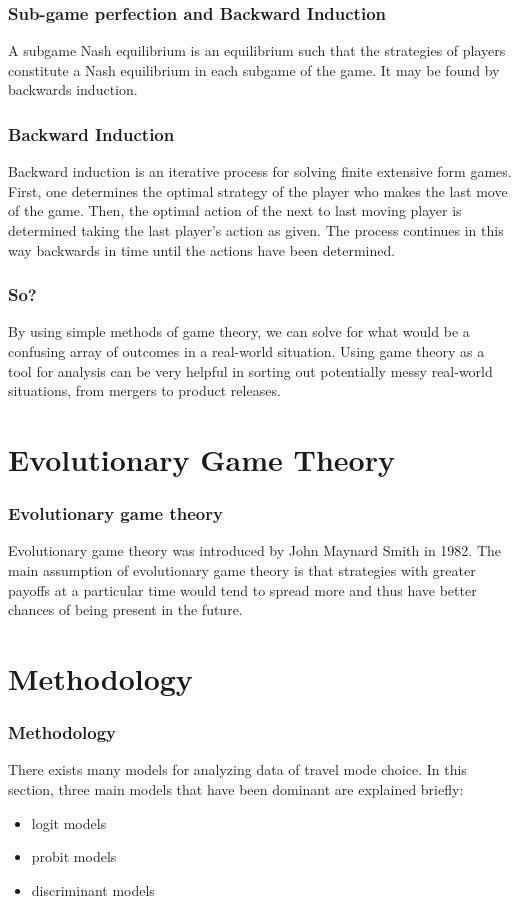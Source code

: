 \documentclass[aspectratio=169]{beamer}
\begin{document}
\begin{frame}
	\frametitle{Sub-game perfection and Backward Induction}
	A subgame Nash equilibrium is an equilibrium such that the strategies of players
constitute a Nash equilibrium in each subgame of the game. It may be found by \alert{backwards induction}.
\end{frame}
\begin{frame}
	\frametitle{Backward Induction}
Backward induction is an iterative process for solving finite extensive form games.
First, one determines the optimal strategy of the player who makes the last move of
the game. Then, the optimal action of the next to last moving player is determined
taking the last player's action as given. The process continues in this way backwards
in time until the actions have been determined.
\end{frame}
\begin{frame}
\frametitle{So?}
By using simple methods of game theory, we can solve for what would be a confusing array of outcomes in a real-world situation. Using game theory as a tool for analysis can be very helpful in sorting out potentially messy real-world situations, from mergers to product releases.

\end{frame}

\section{Evolutionary Game Theory}

\begin{frame}
	\frametitle{Evolutionary game theory}
Evolutionary game theory was introduced by John Maynard Smith in 1982. The main assumption of evolutionary game theory is that strategies with greater payoffs at a particular time would tend to spread more and thus have better chances of being present in the future.
\end{frame}

\section{Methodology}

\begin{frame}
  \frametitle{Methodology}   %
	There exists many models for analyzing data of travel mode choice. In this section, three main models that have been dominant are explained briefly:
  \begin{itemize}
  \item logit models
  \item probit models
  \item discriminant models
  \end{itemize}
\end{frame}
\end{document}
